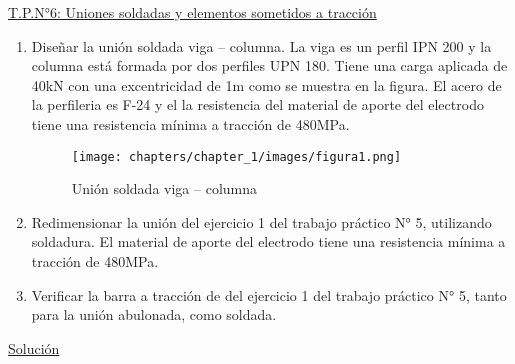 \begin{center}
\underline{\Large{T.P.N°6: Uniones soldadas y elementos sometidos a tracción}}
\end{center}

\begin{enumerate}
\item Diseñar la unión soldada viga – columna. La viga es un perfil IPN 200 y la columna está
formada por dos perfiles UPN 180. Tiene una carga aplicada de 40kN con una excentricidad
de 1m como se muestra en la figura. El acero de la perfileria es F-24 y el la resistencia del
material de aporte del electrodo tiene una resistencia mínima a tracción de 480MPa.

\begin{figure}[H]
\begin{center}
     \texttt{[image: chapters/chapter\_1/images/figura1.png]}
\end{center}
\caption{Unión soldada viga – columna}
\end{figure}
\item Redimensionar la unión del ejercicio 1 del trabajo práctico N° 5, utilizando soldadura. El
material de aporte del electrodo tiene una resistencia mínima a tracción de 480MPa.

\item Verificar la barra a tracción de del ejercicio 1 del trabajo práctico N° 5, tanto para la unión
abulonada, como soldada.

\end{enumerate}

\newpage

\begin{center}
\underline{\Large{Solución}}
\end{center}

